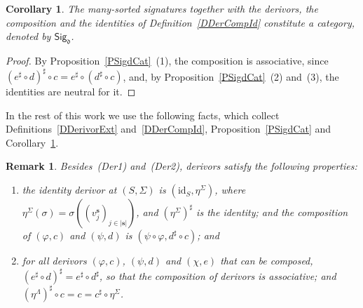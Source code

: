\documentclass[a4paper, reqno
]{amsart}
\newcommand{\bb}[1]{\ensuremath{\lvert #1 \rvert}}
\newcommand{\id}{\mathrm{id}}
\theoremstyle{plain}
\newtheorem{corollary}[theorem]{Corollary}
\newtheorem{remark}[theorem]{Remark}
\theoremstyle{definition}
\begin{document}
\begin{corollary}\label{CSigdCat}
The many-sorted signatures together with the derivors, the composition and the identities of Definition~\ref{DDerCompId} constitute a category, denoted by $\mathsf{Sig}_{\mathfrak{d}}$.
\end{corollary}
\begin{proof}
By Proposition~\ref{PSigdCat}~(1), the composition is associative, since $(e^{\sharp}\circ d)^{\sharp}\circ c=e^{\sharp}\circ(d^{\sharp}\circ c)$, and, by Proposition~\ref{PSigdCat}~(2) and~(3), the identities are neutral for it.
\end{proof}

In the rest of this work we use the following facts, which collect Definitions~\ref{DDerivorExt} and~\ref{DDerCompId}, Proposition~\ref{PSigdCat} and Corollary~\ref{CSigdCat}.

\begin{remark}\label{RDerivorTerms}
Besides~(Der1) and~(Der2), derivors satisfy the following properties:
\begin{enumerate}
\item[(Der3)] the identity derivor at $(S,\Sigma)$ is $(\id_{S},\eta^{\Sigma})$, where $\eta^{\Sigma}(\sigma)=\sigma((v^{\mathbf{s}}_{j})_{j\in\bb{\mathbf{s}}})$, and $(\eta^{\Sigma})^{\sharp}$ is the identity; and the composition of $(\varphi,c)$ and $(\psi,d)$ is $(\psi\circ\varphi,d^{\sharp}\circ c)$; and
\item[(Der4)] for all derivors $(\varphi,c)$, $(\psi,d)$ and $(\chi,e)$ that can be composed, $(e^{\sharp}\circ d)^{\sharp}=e^{\sharp}\circ d^{\sharp}$, so that the composition of derivors is associative; and $(\eta^{\Lambda})^{\sharp}\circ c=c=c^{\sharp}\circ\eta^{\Sigma}$.
\end{enumerate}
\end{remark}
\end{document}
